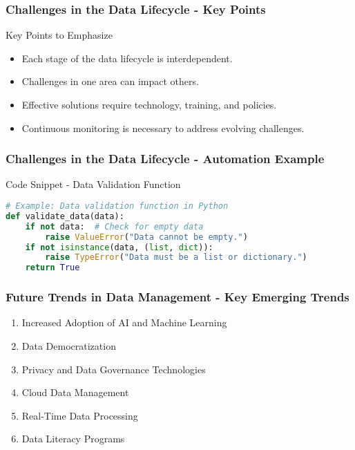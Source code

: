 \documentclass[aspectratio=169]{beamer}
\begin{document}
\begin{frame}[fragile]
  \frametitle{Challenges in the Data Lifecycle - Key Points}

  \begin{block}{Key Points to Emphasize}
    \begin{itemize}
      \item Each stage of the data lifecycle is interdependent.
      \item Challenges in one area can impact others.
      \item Effective solutions require technology, training, and policies.
      \item Continuous monitoring is necessary to address evolving challenges.
    \end{itemize}
  \end{block}

\end{frame}

\begin{frame}[fragile]
  \frametitle{Challenges in the Data Lifecycle - Automation Example}

  \begin{block}{Code Snippet - Data Validation Function}
    \begin{lstlisting}[language=Python]
# Example: Data validation function in Python
def validate_data(data):
    if not data:  # Check for empty data
        raise ValueError("Data cannot be empty.")
    if not isinstance(data, (list, dict)):
        raise TypeError("Data must be a list or dictionary.")
    return True
    \end{lstlisting}
  \end{block}

\end{frame}

\begin{frame}[fragile]
    \frametitle{Future Trends in Data Management - Key Emerging Trends}
    \begin{enumerate}
        \item Increased Adoption of AI and Machine Learning
        \item Data Democratization
        \item Privacy and Data Governance Technologies
        \item Cloud Data Management
        \item Real-Time Data Processing
        \item Data Literacy Programs
    \end{enumerate}
\end{frame}
\end{document}
